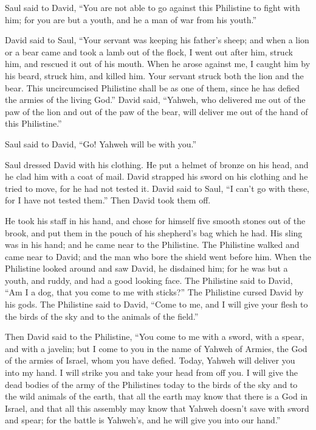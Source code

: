 \begin{paracol}{2}
\begin{otherlanguage}{english}
 Saul said to David, ``You are not able to go against
this Philistine to fight with him; for you are but a youth, and he a man
of war from his youth.''

 David said to Saul, ``Your servant was keeping his
father's sheep; and when a lion or a bear came and took a lamb out of
the flock,  I went out after him, struck him, and rescued
it out of his mouth. When he arose against me, I caught him by his
beard, struck him, and killed him.  Your servant struck
both the lion and the bear. This uncircumcised Philistine shall be as
one of them, since he has defied the armies of the living God.''
 David said, ``Yahweh, who delivered me out of the paw of
the lion and out of the paw of the bear, will deliver me out of the hand
of this Philistine.''

Saul said to David, ``Go! Yahweh will be with you.''

 Saul dressed David with his clothing. He put a helmet of
bronze on his head, and he clad him with a coat of mail. 
David strapped his sword on his clothing and he tried to move, for he
had not tested it. David said to Saul, ``I can't go with these, for I
have not tested them.'' Then David took them off.

 He took his staff in his hand, and chose for himself
five smooth stones out of the brook, and put them in the pouch of his
shepherd's bag which he had. His sling was in his hand; and he came near
to the Philistine.  The Philistine walked and came near
to David; and the man who bore the shield went before him.
 When the Philistine looked around and saw David, he
disdained him; for he was but a youth, and ruddy, and had a good looking
face.  The Philistine said to David, ``Am I a dog, that
you come to me with sticks?'' The Philistine cursed David by his gods.
 The Philistine said to David, ``Come to me, and I will
give your flesh to the birds of the sky and to the animals of the
field.''

 Then David said to the Philistine, ``You come to me with
a sword, with a spear, and with a javelin; but I come to you in the name
of Yahweh of Armies, the God of the armies of Israel, whom you have
defied.  Today, Yahweh will deliver you into my hand. I
will strike you and take your head from off you. I will give the dead
bodies of the army of the Philistines today to the birds of the sky and
to the wild animals of the earth, that all the earth may know that there
is a God in Israel,  and that all this assembly may know
that Yahweh doesn't save with sword and spear; for the battle is
Yahweh's, and he will give you into our hand.''


\end{otherlanguage}
\end{paracol}
